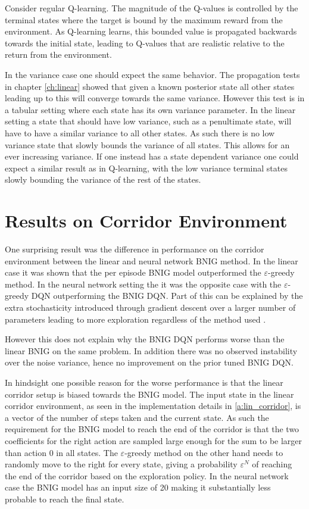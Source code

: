 Consider regular Q-learning. The magnitude of the Q-values is controlled by the terminal states where the target is bound by the maximum reward from the environment. As Q-learning learns, this bounded value is propagated backwards towards the initial state, leading to Q-values that are realistic relative to the return from the environment.

In the variance case one should expect the same behavior. The propagation tests in chapter \ref{ch:linear} showed that given a known posterior state all other states leading up to this will converge towards the same variance. However this test is in a tabular setting where each state has its own variance parameter. In the linear setting a state that should have low variance, such as a penultimate state, will have to have a similar variance to all other states. As such there is no low variance state that slowly bounds the variance of all states. This allows for an ever increasing variance. If one instead has a state dependent variance one could expect a similar result as in Q-learning, with the low variance terminal states slowly bounding the variance of the rest of the states.

\section{Results on Corridor Environment}

One surprising result was the difference in performance on the corridor environment between the linear and neural network BNIG method. In the linear case it was shown that the per episode BNIG model outperformed the $\varepsilon$-greedy method. In the neural network setting the it was the opposite case with the $\varepsilon$-greedy DQN outperforming the BNIG DQN. Part of this can be explained by the extra stochasticity introduced through gradient descent over a larger number of parameters leading to more exploration regardless of the method used \citep{carlos_2018}. 

However this does not explain why the BNIG DQN performs worse than the linear BNIG on the same problem. In addition there was no observed instability over the noise variance, hence no improvement on the prior tuned BNIG DQN.

In hindsight one possible reason for the worse performance is that the linear corridor setup is biased towards the BNIG model. The input state in the linear corridor environment, as seen in the implementation details in \ref{a:lin_corridor}, is a vector of the number of steps taken and the current state. As such the requirement for the BNIG model to reach the end of the corridor is that the two coefficients for the right action are sampled large enough for the sum to be larger than action 0 in all states. The $\varepsilon$-greedy method on the other hand needs to randomly move to the right for every state, giving a probability $\varepsilon^N$ of reaching the end of the corridor based on the exploration policy. In the neural network case the BNIG model has an input size of 20 making it substantially less probable to reach the final state.

